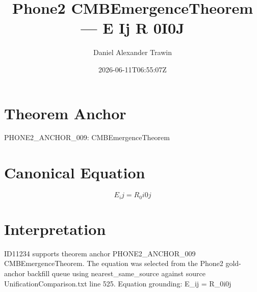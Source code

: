 \documentclass[11pt]{article}
\title{Phone2 CMBEmergenceTheorem — E Ij R 0I0J}
\author{Daniel Alexander Trawin}
\date{2026-06-11T06:55:07Z}
\begin{document}
\maketitle
\section*{Theorem Anchor}
PHONE2_ANCHOR_009: CMBEmergenceTheorem
\section*{Canonical Equation}
\[
E_ij = R_0i0j
\]
\section*{Interpretation}
ID11234 supports theorem anchor PHONE2_ANCHOR_009 CMBEmergenceTheorem. The equation was selected from the Phone2 gold-anchor backfill queue using nearest_same_source against source UnificationComparison.txt line 525. Equation grounding: E_ij = R_0i0j
\end{document}
